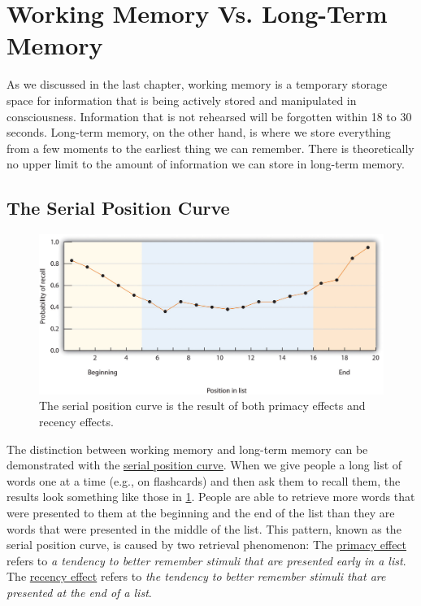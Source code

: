 \documentclass[
]{krantz}
\begin{document}
\section{Working Memory Vs. Long-Term Memory}\label{working-memory-vs.-long-term-memory}

As we discussed in the last chapter, working memory is a temporary storage space for information that is being actively stored and manipulated in consciousness. Information that is not rehearsed will be forgotten within 18 to 30 seconds. Long-term memory, on the other hand, is where we store everything from a few moments to the earliest thing we can remember. There is theoretically no upper limit to the amount of information we can store in long-term memory.

\subsection*{The Serial Position Curve}\label{the-serial-position-curve}


\begin{figure}

{\centering \includegraphics[width=0.8\linewidth]{images/ch5/fig1} 

}

\caption{The serial position curve is the result of both primacy effects and recency effects.}\label{fig:serialposition}
\end{figure}

The distinction between working memory and long-term memory can be demonstrated with the \hyperref[serial-position-curve]{serial position curve}. When we give people a long list of words one at a time (e.g., on flashcards) and then ask them to recall them, the results look something like those in \ref{fig:serialposition}. People are able to retrieve more words that were presented to them at the beginning and the end of the list than they are words that were presented in the middle of the list. This pattern, known as the serial position curve, is caused by two retrieval phenomenon: The \hyperref[primacy-effect]{primacy effect} refers to \emph{a tendency to better remember stimuli that are presented early in a list}. The \hyperref[recency-effect]{recency effect} refers to \emph{the tendency to better remember stimuli that are presented at the end of a list}.
\end{document}
